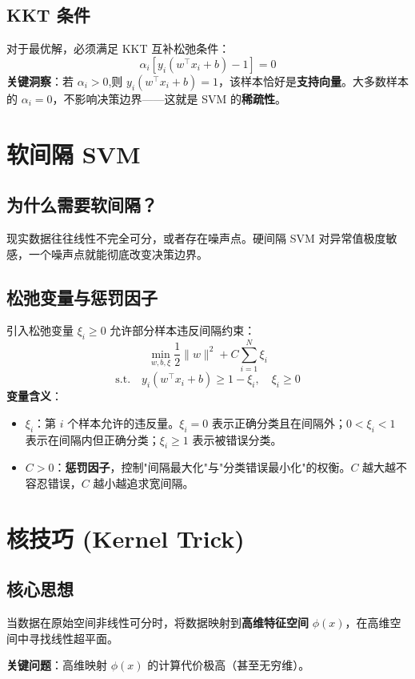 \documentclass[12pt, a4paper]{article}
\begin{document}
\subsection{KKT 条件}
对于最优解，必须满足 KKT 互补松弛条件：
$$ \alpha_i \left[ y_i(w^\top x_i + b) - 1 \right] = 0 $$
\textbf{关键洞察}：若 $\alpha_i > 0$,则 $y_i(w^\top x_i + b) = 1$，该样本恰好是\textbf{支持向量}。大多数样本的 $\alpha_i = 0$，不影响决策边界——这就是 SVM 的\textbf{稀疏性}。

\section{软间隔 SVM}

\subsection{为什么需要软间隔？}
现实数据往往线性不完全可分，或者存在噪声点。硬间隔 SVM 对异常值极度敏感，一个噪声点就能彻底改变决策边界。

\subsection{松弛变量与惩罚因子}
引入松弛变量 $\xi_i \geq 0$ 允许部分样本违反间隔约束：
$$ \min_{w, b, \xi} \frac{1}{2}\|w\|^2 + C \sum_{i=1}^N \xi_i $$
$$ \text{s.t.} \quad y_i(w^\top x_i + b) \geq 1 - \xi_i, \quad \xi_i \geq 0 $$
\textbf{变量含义}：
\begin{itemize}
    \item $\xi_i$：第 $i$ 个样本允许的违反量。$\xi_i = 0$ 表示正确分类且在间隔外；$0 < \xi_i < 1$ 表示在间隔内但正确分类；$\xi_i \geq 1$ 表示被错误分类。
    \item $C > 0$：\textbf{惩罚因子}，控制"间隔最大化"与"分类错误最小化"的权衡。$C$ 越大越不容忍错误，$C$ 越小越追求宽间隔。
\end{itemize}

\section{核技巧 (Kernel Trick)}

\subsection{核心思想}
当数据在原始空间非线性可分时，将数据映射到\textbf{高维特征空间} $\phi(x)$，在高维空间中寻找线性超平面。

\textbf{关键问题}：高维映射 $\phi(x)$ 的计算代价极高（甚至无穷维）。
\end{document}
